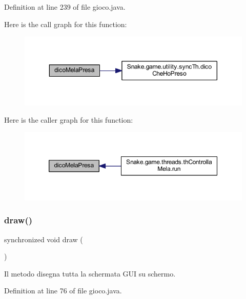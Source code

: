 Definition at line 239 of file gioco.\+java.

Here is the call graph for this function\+:
\nopagebreak
\begin{figure}[H]
\begin{center}
\leavevmode
\includegraphics[width=350pt]{class_snake_1_1game_1_1gioco_a5309846aa7b0465c29959c51b0182ced_cgraph}
\end{center}
\end{figure}
Here is the caller graph for this function\+:
\nopagebreak
\begin{figure}[H]
\begin{center}
\leavevmode
\includegraphics[width=350pt]{class_snake_1_1game_1_1gioco_a5309846aa7b0465c29959c51b0182ced_icgraph}
\end{center}
\end{figure}
\mbox{\label{class_snake_1_1game_1_1gioco_a4262ff48c6fe3e20a0e3c9295158e375}} 
\subsubsection{\texorpdfstring{draw()}{draw()}}
{\footnotesize\ttfamily synchronized void draw (\begin{DoxyParamCaption}{ }\end{DoxyParamCaption})}



Il metodo disegna tutta la schermata G\+UI su schermo. 



Definition at line 76 of file gioco.\+java.

